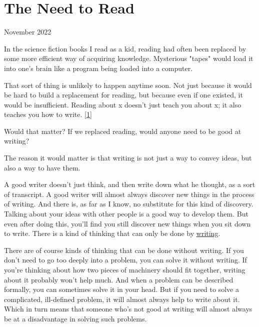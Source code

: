 \chapter{The Need to Read}


            
              
                

November 2022

In the science fiction books I read
                  as a kid, reading had often been replaced by some more
                  efficient way of acquiring knowledge. Mysterious "tapes" would
                  load it into one's brain like a program being loaded into a
                  computer.

That sort of thing is unlikely to happen
                  anytime soon. Not just because it would be hard to build a
                  replacement for reading, but because even if one existed, it
                  would be insufficient. Reading about x doesn't just teach you
                  about x; it also teaches you how to write.
                  [\href{\#f1n}{1}]

Would that matter? If we replaced reading, would
                  anyone need to be good at writing?

The reason it
                  would matter is that writing is not just a way to convey
                  ideas, but also a way to have them.

A good writer
                  doesn't just think, and then write down what he thought, as a
                  sort of transcript. A good writer will almost always discover
                  new things in the process of writing. And there is, as far as
                  I know, no substitute for this kind of discovery. Talking
                  about your ideas with other people is a good way to develop
                  them. But even after doing this, you'll find you still
                  discover new things when you sit down to write. There is a
                  kind of thinking that can only be done by
                  \href{http://www.paulgraham.com/words.html}{\underline{writing}}.

There are of course kinds of thinking that can
                  be done without writing. If you don't need to go too deeply
                  into a problem, you can solve it without writing. If you're
                  thinking about how two pieces of machinery should fit
                  together, writing about it probably won't help much. And when
                  a problem can be described formally, you can sometimes solve
                  it in your head. But if you need to solve a complicated,
                  ill-defined problem, it will almost always help to write about
                  it. Which in turn means that someone who's not good at writing
                  will almost always be at a disadvantage in solving such
                  problems.

